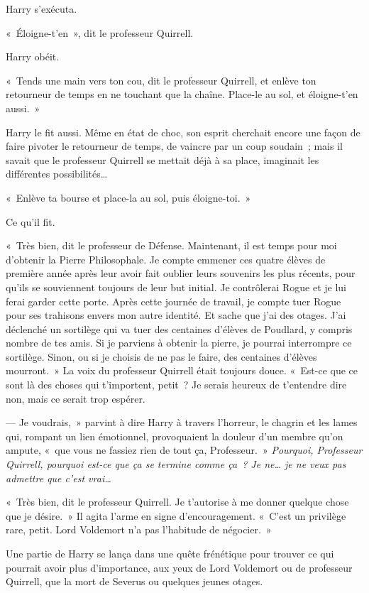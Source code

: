 Harry s'exécuta.

«~Éloigne-t'en~», dit le professeur Quirrell.

Harry obéit.

«~Tends une main vers ton cou, dit le professeur Quirrell, et enlève ton retourneur de temps en ne touchant que la chaîne.
Place-le au sol, et éloigne-t'en aussi.~»

Harry le fit aussi.
Même en état de choc, son esprit cherchait encore une façon de faire pivoter le retourneur de temps, de vaincre par un coup soudain~; mais il savait que le professeur Quirrell se mettait déjà à sa place, imaginait les différentes possibilités…

«~Enlève ta bourse et place-la au sol, puis éloigne-toi.~»

Ce qu'il fit.

«~Très bien, dit le professeur de Défense.
Maintenant, il est temps pour moi d'obtenir la Pierre Philosophale.
Je compte emmener ces quatre élèves de première année après leur avoir fait oublier leurs souvenirs les plus récents, pour qu'ils se souviennent toujours de leur but initial.
Je contrôlerai Rogue et je lui ferai garder cette porte.
Après cette journée de travail, je compte tuer Rogue pour ses trahisons envers mon autre identité.
Et sache que j'ai des otages.
J'ai déclenché un sortilège qui va tuer des centaines d'élèves de Poudlard, y compris nombre de tes amis.
Si je parviens à obtenir la pierre, je pourrai interrompre ce sortilège.
Sinon, ou si je choisis de ne pas le faire, des centaines d'élèves mourront.~»
La voix du professeur Quirrell était toujours douce.
«~Est-ce que ce sont là des choses qui t'importent, petit~?
Je serais heureux de t'entendre dire non, mais ce serait trop espérer.

--- Je voudrais,~» parvint à dire Harry à travers l'horreur, le chagrin et les lames qui, rompant un lien émotionnel, provoquaient la douleur d'un membre qu'on ampute, «~que vous ne fassiez rien de tout ça, Professeur.~»
\emph{Pourquoi, Professeur Quirrell, pourquoi est-ce que ça se termine comme ça~?
Je ne… je ne veux pas admettre que c'est vrai…}

«~Très bien, dit le professeur Quirrell.
Je t'autorise à me donner quelque chose que je désire.~»
Il agita l'arme en signe d'encouragement.
«~C'est un privilège rare, petit.
Lord Voldemort n'a pas l'habitude de négocier.~»

Une partie de Harry se lança dans une quête frénétique pour trouver ce qui pourrait avoir plus d'importance, aux yeux de Lord Voldemort ou de professeur Quirrell, que la mort de Severus ou quelques jeunes otages.

